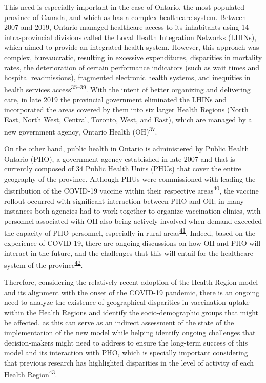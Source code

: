 \documentclass[
]{article}
\begin{document}
This need is especially important in the case of Ontario, the most
populated province of Canada, and which as has a complex healthcare
system. Between 2007 and 2019, Ontario managed healthcare access to its
inhabitants using 14 intra-provincial divisions called the Local Health
Integration Networks (LHINs), which aimed to provide an integrated
health system. However, this approach was complex, bureaucratic,
resulting in excessive expenditures, disparities in mortality rates, the
deterioration of certain performance indicators (such as wait times and
hospital readmissions), fragmented electronic health systems, and
inequities in health services
access\textsuperscript{\protect\hyperlink{ref-tsasis2012}{35}--\protect\hyperlink{ref-lysyk2016}{39}}.
With the intent of better organizing and delivering care, in late 2019
the provincial government eliminated the LHINs and incorporated the
areas covered by them into six larger Health Regions (North East, North
West, Central, Toronto, West, and East), which are managed by a new
government agency, Ontario Health
(OH)\textsuperscript{\protect\hyperlink{ref-dong2022}{37}}.

On the other hand, public health in Ontario is administered by Public
Health Ontario (PHO), a government agency established in late 2007 and
that is currently composed of 34 Public Health Units (PHUs) that cover
the entire geography of the province. Although PHUs were commissioned
with leading the distribution of the COVID-19 vaccine within their
respective
areas\textsuperscript{\protect\hyperlink{ref-rotenberg2021}{40}}, the
vaccine rollout occurred with significant interaction between PHO and
OH; in many instances both agencies had to work together to organize
vaccination clinics, with personnel associated with OH also being
actively involved when demand exceeded the capacity of PHO personnel,
especially in rural
areas\textsuperscript{\protect\hyperlink{ref-ashcroft2023}{41}}. Indeed,
based on the experience of COVID-19, there are ongoing discussions on
how OH and PHO will interact in the future, and the challenges that this
will entail for the healthcare system of the
province\textsuperscript{\protect\hyperlink{ref-dion2022}{42}}.

Therefore, considering the relatively recent adoption of the Health
Region model and its alignment with the onset of the COVID-19 pandemic,
there is an ongoing need to analyze the existence of geographical
disparities in vaccination uptake within the Health Regions and identify
the socio-demographic groups that might be affected, as this can serve
as an indirect assessment of the state of the implementation of the new
model while helping identify ongoing challenges that decision-makers
might need to address to ensure the long-term success of this model and
its interaction with PHO, which is specially important considering that
previous research has highlighted disparities in the level of activity
of each Health
Region\textsuperscript{\protect\hyperlink{ref-sethuram2023}{43}}.
\end{document}
